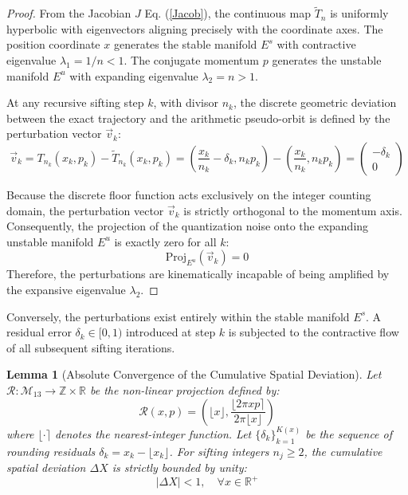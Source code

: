 \documentclass[sn-mathphys-num, pdflatex]{sn-jnl}
\newtheorem{lemma}{Lemma}
\begin{document}
\begin{proof}
From the Jacobian $J$ Eq. (\ref{Jacob}), the continuous map $\tilde{T}_n$ is uniformly hyperbolic with eigenvectors aligning precisely with the coordinate axes. The position coordinate $x$ generates the stable manifold $E^s$ with contractive eigenvalue $\lambda_1 = 1/n < 1$. The conjugate momentum $p$ generates the unstable manifold $E^u$ with expanding eigenvalue $\lambda_2 = n > 1$.

At any recursive sifting step $k$, with divisor $n_k$, the discrete geometric deviation between the exact trajectory and the arithmetic pseudo-orbit is defined by the perturbation vector $\vec{v}_k$:
$$ \vec{v}_k = T_{n_k}(x_k, p_k) - \tilde{T}_{n_k}(x_k, p_k) = \left( \frac{x_k}{n_k} - \delta_k, n_k p_k \right) - \left( \frac{x_k}{n_k}, n_k p_k \right) = \begin{pmatrix} -\delta_k \\ 0 \end{pmatrix} $$

Because the discrete floor function acts exclusively on the integer counting domain, the perturbation vector $\vec{v}_k$ is strictly orthogonal to the momentum axis. Consequently, the projection of the quantization noise onto the expanding unstable manifold $E^u$ is exactly zero for all $k$:
$$ \text{Proj}_{E^u}(\vec{v}_k) = 0 $$
Therefore, the perturbations are kinematically incapable of being amplified by the expansive eigenvalue $\lambda_2$. 
\end{proof}
Conversely, the perturbations exist entirely within the stable manifold $E^s$. A residual error $\delta_k \in [0,1)$ introduced at step $k$ is subjected to the contractive flow of all subsequent sifting iterations. 
\begin{lemma}[Absolute Convergence of the Cumulative Spatial Deviation]
\label{lem:delta_x_bound}
Let $\mathcal{R}: \mathcal{M}_{13} \to \mathbb{Z} \times \mathbb{R}$ be the non-linear projection defined by:
\begin{equation}
\label{R}
\mathcal{R}(x, p) = \left( \lfloor x \rfloor, \frac{\lfloor 2\pi xp \rceil}{2\pi \lfloor x \rfloor} \right)
\end{equation}
where $\lfloor \cdot \rceil$ denotes the nearest-integer function. Let $\{\delta_k\}_{k=1}^{K(x)}$ be the sequence of rounding residuals $\delta_k = x_k - \lfloor x_k \rfloor$. For sifting integers $n_j \ge 2$, the cumulative spatial deviation $\Delta X$ is strictly bounded by unity:
\begin{equation}
|\Delta X| < 1, \quad \forall x \in \mathbb{R}^+
\end{equation}
\end{lemma}
\end{document}
